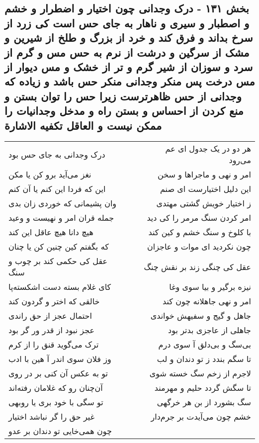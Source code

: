 \begin{center}
\section*{بخش ۱۳۱ - درک وجدانی چون اختیار و اضطرار و خشم و اصطبار و سیری و ناهار به جای حس است کی زرد از سرخ بداند و فرق کند و خرد از بزرگ و طلخ از شیرین و مشک از سرگین و درشت از نرم به حس مس و گرم از سرد و سوزان از شیر گرم و تر از خشک و مس دیوار از مس درخت پس منکر وجدانی منکر حس باشد و زیاده که وجدانی از حس ظاهرترست زیرا حس را توان بستن و منع کردن از احساس و بستن راه و مدخل وجدانیات را ممکن نیست و العاقل تکفیه الاشارة}
\label{sec:sh131}
\begin{longtable}{l p{0.5cm} r}
درک وجدانی به جای حس بود
&&
هر دو در یک جدول ای عم می‌رود
\\
نغز می‌آید برو کن یا مکن
&&
امر و نهی و ماجراها و سخن
\\
این که فردا این کنم یا آن کنم
&&
این دلیل اختیارست ای صنم
\\
وان پشیمانی که خوردی زان بدی
&&
ز اختیار خویش گشتی مهتدی
\\
جمله قران امر و نهیست و وعید
&&
امر کردن سنگ مرمر را کی دید
\\
هیچ دانا هیچ عاقل این کند
&&
با کلوخ و سنگ خشم و کین کند
\\
که بگفتم کین چنین کن یا چنان
&&
چون نکردید ای موات و عاجزان
\\
عقل کی حکمی کند بر چوب و سنگ
&&
عقل کی چنگی زند بر نقش چنگ
\\
کای غلام بسته دست اشکسته‌پا
&&
نیزه برگیر و بیا سوی وغا
\\
خالقی که اختر و گردون کند
&&
امر و نهی جاهلانه چون کند
\\
احتمال عجز از حق راندی
&&
جاهل و گیج و سفیهش خواندی
\\
عجز نبود از قدر ور گر بود
&&
جاهلی از عاجزی بدتر بود
\\
ترک می‌گوید قنق را از کرم
&&
بی‌سگ و بی‌دلق آ سوی درم
\\
وز فلان سوی اندر آ هین با ادب
&&
تا سگم بندد ز تو دندان و لب
\\
تو به عکس آن کنی بر در روی
&&
لاجرم از زخم سگ خسته شوی
\\
آن‌چنان رو که غلامان رفته‌اند
&&
تا سگش گردد حلیم و مهرمند
\\
تو سگی با خود بری یا روبهی
&&
سگ بشورد از بن هر خرگهی
\\
غیر حق را گر نباشد اختیار
&&
خشم چون می‌آیدت بر جرم‌دار
\\
چون همی‌خایی تو دندان بر عدو

\end{longtable}
\end{center}
